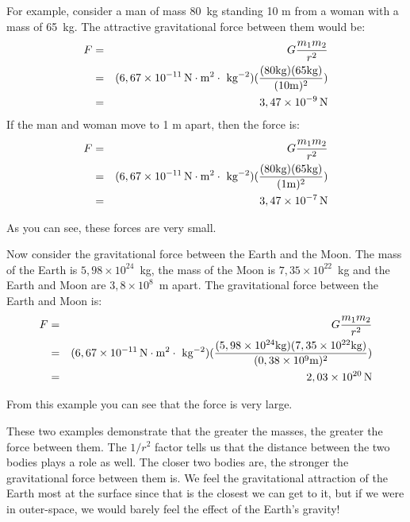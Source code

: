 For example, consider a man of mass 80~kg standing 10 m from a woman with a mass of 65~kg. The attractive gravitational force between them would be:
\begin{eqnarray*}
F &=& G \frac{m_1 m_2}{r^2}\\
&=& (6,67 \times 10^{-11}\,\rm{N}\cdot m^2\cdot~kg^{-2})(\frac{(80 kg)(65 kg)}{(10 m)^2})\\
&=&3,47 \times 10^{-9}\,\rm{N}
\end{eqnarray*}
If the man and woman move to 1 m apart, then the force is:
\begin{eqnarray*}
F &=& G \frac{m_1 m_2}{r^2}\\
&=& (6,67 \times 10^{-11}\,\rm{N}\cdot m^2\cdot~kg^{-2})(\frac{(80 kg)(65 kg)}{(1 m)^2})\\
&=&3,47 \times 10^{-7}\,\rm{N}
\end{eqnarray*}

As you can see, these forces are very small.

Now consider the gravitational force between the Earth and the Moon. The mass of the Earth is $5,98\times 10^{24}$~kg, the mass of the Moon is $7,35\times 10^{22}$~kg and the Earth and Moon are $3,8 \times 10^{8}$~m apart. The gravitational force between the Earth and Moon is:
\begin{eqnarray*}
F &=& G \frac{m_1 m_2}{r^2}\\
&=& (6,67 \times 10^{-11}\,\rm{N}\cdot m^2\cdot~kg^{-2})(\frac{(5,98\times 10^{24} kg)(7,35\times 10^{22} kg)}{(0,38 \times 10^{9} m)^2})\\
&=&2,03\times 10^{20}\,\rm{N}
\end{eqnarray*}

From this example you can see that the force is very large.

These two examples demonstrate that the greater the masses, the greater the force between them. The $1/r^2$ factor tells us that the distance between the two bodies plays a role as well. The closer two bodies are, the
stronger the gravitational force between them is. We feel the gravitational attraction of the Earth most at the surface since that is the closest we can get to it, but if we were in outer-space, we would barely feel the effect of the Earth's gravity!

